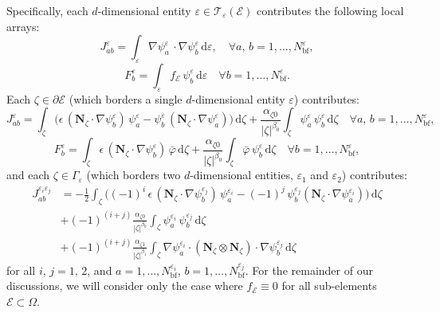 	Specifically, each $d$-dimensional entity $\varepsilon \in \mathcal{T}_\varepsilon (\mathcal{E})$ contributes the following local arrays:
	\begin{equation}
			J^{\varepsilon}_{ab} = \int_{\varepsilon} \nabla \psi^{\varepsilon}_{a} \, \cdot \nabla \psi^{\varepsilon}_{b} \, \mathrm d \varepsilon, \quad \forall a, \, b = 1, \ldots, N^{\varepsilon}_{\mathrm b\mathrm f},
	\end{equation}
	\begin{equation}
			F^{\varepsilon}_b = \int_{\varepsilon} f_{\mathcal{E}} \, \psi_b^{\varepsilon} \, \mathrm d \varepsilon \quad \forall b = 1, \ldots, N^{\varepsilon}_{\mathrm b\mathrm f}.
	\end{equation}
	Each $\zeta \in \partial \mathcal{E}$ (which borders a single $d$-dimensional entity $\varepsilon$) contributes:
	\begin{equation}
			J^{\varepsilon}_{ab} = \int_{\zeta} \bigg( \epsilon \, (\bm{N}_{\zeta} \cdot \nabla \psi^{\varepsilon}_b) \, \psi^{\varepsilon}_a - \psi^{\varepsilon}_b \, (\bm{N}_{\zeta} \cdot \nabla \psi^{\varepsilon}_a) \bigg) \, \mathrm d \zeta + \frac{\alpha_{\zeta0}}{|\zeta|^{\beta_0}} \int_{\zeta} \psi_a^{\varepsilon} \, \psi_b^{\varepsilon} \, \mathrm d \zeta \quad \forall a, \, b = 1, \ldots, N^{\varepsilon}_{\mathrm b\mathrm f},
	\end{equation}
	\begin{equation}
		F^{\varepsilon}_b = \int_{\zeta} \epsilon \, (\bm{N}_{\zeta} \cdot \nabla \psi_b^{\varepsilon}) \, \bar{\varphi} \, \mathrm d \zeta + \frac{\alpha_{\zeta0}}{|\zeta|^{\beta_0}} \int_{\zeta} \bar{\varphi} \, \psi_b^{\varepsilon} \, \mathrm d \zeta \quad \forall b = 1, \ldots, N^{\varepsilon}_{\mathrm b\mathrm f},
		\label{eq:boundary_term}
	\end{equation}
	and each $\zeta \in \Gamma_\varepsilon$ (which borders two $d$-dimensional entities, $\varepsilon_1$ and $\varepsilon_2$) contributes:
	\begin{align}
			J^{\varepsilon_i \varepsilon_j}_{ab} & = - \frac{1}{2} \int_{\zeta} \bigg( (-1)^{i} \, \epsilon \, (\bm{N}_{\zeta} \cdot \nabla \psi_b^{\varepsilon_j}) \, \psi_a^{\varepsilon_i} - (-1)^{j} \, \psi_b^{\varepsilon_j} (\bm{N}_{\zeta} \cdot \nabla \psi_a^{\varepsilon_i}) \bigg) \, \mathrm d \zeta \\
			& + (-1)^{(i+j)} \frac{\alpha_{\zeta0}}{|\zeta|^{\beta_0}} \int_{\zeta} \psi_a^{\varepsilon_i} \, \psi_b^{\varepsilon_j} \, \mathrm d \zeta \\
			& + (-1)^{(i+j)} \frac{\alpha_{\zeta1}}{|\zeta|^{\beta_1}} \int_{\zeta} \nabla \psi_a^{\varepsilon_i} \cdot (\bm{N}_\zeta \otimes \bm{N}_\zeta) \cdot \nabla \psi_b^{\varepsilon_j} \, \mathrm d \zeta
	\end{align}
	for all $i, \, j = 1, \, 2$, and $a = 1, \ldots, N^{\varepsilon_i}_{\mathrm b\mathrm f}$, $b = 1, \ldots, N^{\varepsilon_j}_{\mathrm b\mathrm f}$. For the remainder of our discussions, we will consider only the case where $f_\mathcal{E} \equiv 0$ for all sub-elements $\mathcal{E} \subset \Omega$.
	
